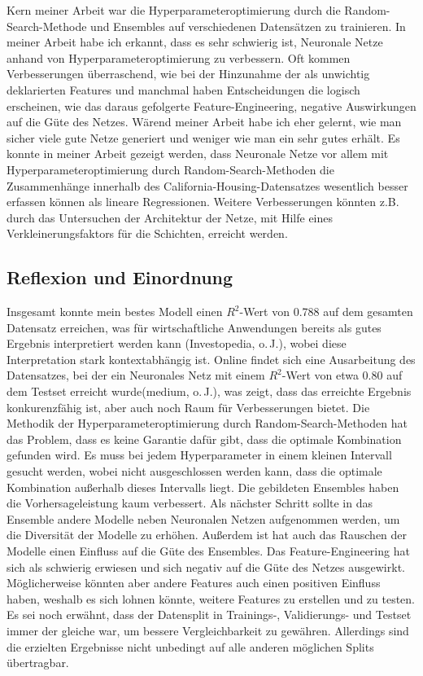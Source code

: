 \documentclass[9pt,a4paper,twocolumn,twoside]{tau-class/tau}
\begin{document}
Kern meiner Arbeit war die Hyperparameteroptimierung durch die Random-Search-Methode und Ensembles auf verschiedenen Datensätzen zu trainieren.
In meiner Arbeit habe ich erkannt, dass es sehr schwierig ist, Neuronale Netze anhand von Hyperparameteroptimierung zu verbessern.
Oft kommen Verbesserungen überraschend, wie bei der Hinzunahme der als unwichtig deklarierten Features und manchmal haben Entscheidungen die 
logisch erscheinen, wie das daraus gefolgerte Feature-Engineering, negative Auswirkungen auf die Güte des Netzes.
Wärend meiner Arbeit habe ich eher gelernt, wie man sicher viele gute Netze generiert und weniger wie man ein sehr gutes erhält.
Es konnte in meiner Arbeit gezeigt werden, dass Neuronale Netze vor allem mit Hyperparameteroptimierung durch Random-Search-Methoden die
Zusammenhänge innerhalb des California-Housing-Datensatzes wesentlich besser erfassen können als lineare Regressionen. 
Weitere Verbesserungen könnten z.B. durch das Untersuchen der Architektur der Netze, mit Hilfe eines Verkleinerungsfaktors für  die Schichten, erreicht werden. 

\subsection{Reflexion und Einordnung}

Insgesamt konnte mein bestes Modell einen $R^2$-Wert von 0.788 auf dem gesamten Datensatz erreichen, was für wirtschaftliche Anwendungen bereits als gutes Ergebnis interpretiert werden kann (Investopedia, o.\,J.), wobei diese Interpretation
stark kontextabhängig ist. Online findet sich eine Ausarbeitung des Datensatzes, bei der ein Neuronales Netz mit einem $R^2$-Wert von etwa 0.80 auf dem Testset erreicht wurde(medium, o.\,J.), was zeigt, dass das erreichte
Ergebnis konkurenzfähig ist, aber auch noch Raum für Verbesserungen bietet. 
Die Methodik der Hyperparameteroptimierung durch Random-Search-Methoden hat das Problem, dass es keine Garantie dafür gibt, dass die optimale Kombination gefunden wird. Es muss bei jedem Hyperparameter in einem kleinen Intervall 
gesucht werden, wobei nicht ausgeschlossen werden kann, dass die optimale Kombination außerhalb dieses Intervalls liegt. 
Die gebildeten Ensembles haben die Vorhersageleistung kaum verbessert. Als nächster Schritt sollte in das Ensemble andere Modelle neben Neuronalen Netzen aufgenommen werden, um die Diversität der Modelle zu erhöhen.
Außerdem ist hat auch das Rauschen der Modelle einen Einfluss auf die Güte des Ensembles. 
Das Feature-Engineering hat sich als schwierig erwiesen und sich negativ auf die Güte des Netzes ausgewirkt. Möglicherweise könnten aber andere 
Features auch einen positiven Einfluss haben, weshalb es sich lohnen könnte, weitere Features zu erstellen und zu testen.
Es sei noch erwähnt, dass der Datensplit in Trainings-, Validierungs- und Testset immer der gleiche war, um bessere Vergleichbarkeit zu gewähren.
Allerdings sind die erzielten Ergebnisse nicht unbedingt auf alle anderen möglichen Splits übertragbar.
\end{document}
